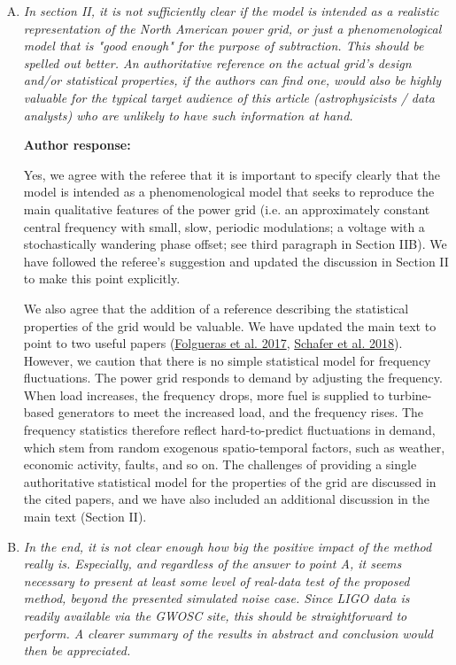 \documentclass[10pt]{article}
\begin{document}
\begin{enumerate}[A.]
	\item \textit{In section II, it is not sufficiently clear if the model is  
		intended as a realistic representation of the North American power grid, or just  
		a phenomenological model that is "good enough" for the purpose of subtraction.  
		This should be spelled out better. An authoritative reference on the actual  
		grid's design and/or statistical properties, if the authors can find one, would  
		also be highly valuable for the typical target audience of this article  
		(astrophysicists / data analysts) who are unlikely to have such information at  
		hand.}
	
		\textbf{Author response:} 
	
	Yes, we agree with the referee that it is important to specify clearly that the model is intended as a phenomenological model that seeks to reproduce the main qualitative features of the power grid (i.e. an approximately constant central frequency with small, slow, periodic modulations; a voltage with a stochastically wandering phase offset; see third paragraph in Section IIB). We have followed the referee's suggestion and updated the discussion in Section II to make this point explicitly.
	

	
	We also agree that the addition of a reference describing the statistical properties of the grid would be valuable. We have updated the main text to point to two useful papers (\href{https://www.nrel.gov/docs/fy18osti/70029.pdf}{Folgueras et al. 2017}, \href{https://ieeexplore.ieee.org/abstract/document/8571793}{Schafer et al. 2018}). However, we caution that there is no simple statistical model for frequency fluctuations. The power grid responds to demand by adjusting the frequency. When load increases, the frequency drops, more fuel is supplied to turbine-based generators to meet the increased load, and the frequency rises. The frequency statistics therefore reflect hard-to-predict fluctuations in demand, which stem from random exogenous spatio-temporal factors, such as weather, economic activity, faults, and so on. The challenges of providing a single authoritative statistical model for the properties of the grid are discussed in the cited papers, and we have also included an additional discussion in the main text (Section II).


		\item \textit{In the end, it is not clear enough how big the positive impact of  
			the method really is. Especially, and regardless of the answer to point A, it  
			seems necessary to present at least some level of real-data test of the proposed  
			method, beyond the presented simulated noise case. Since LIGO data is readily  
			available via the GWOSC site, this should be straightforward to perform. A  
			clearer summary of the results in abstract and conclusion would then be  
			appreciated.}
	

\end{enumerate}
\end{document}
